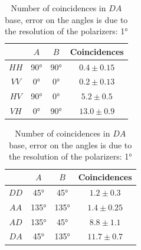 \documentclass[a4paper,10pt]{article}
\begin{document}
\begin{table}[h]
\centering
\begin{minipage}{.48\textwidth}
\centering
\begin{tabular}{c|c|c|c}
  & $A$& $B$& Coincidences \\
\hline
$HH$ & 90° & 90° & $0.4 \pm 0.15$\\
$VV$ & 0° & 0° & $0.2 \pm 0.13$\\
$HV$ & 90° & 0° & $5.2 \pm 0.5$ \\
$VH$ & 0° & 90° & $13.0\pm 0.9$\\
\end{tabular}
\caption{\label{tab:visibilityHV}Number of coincidences in $HV$ base, error on the angles is due to the resolution of the polarizers: 1°}
\end{minipage}\hspace{1.5em}%
\begin{minipage}{.48\textwidth}
\centering
\begin{tabular}{c|c|c|c}
  & $A$& $B$& Coincidences \\
\hline
$DD$ & 45° & 45° & $1.2 \pm 0.3$\\
$AA$ & 135° & 135° & $1.4 \pm 0.25$\\
$AD$ & 135° & 45° & $8.8 \pm 1.1$ \\
$DA$ & 45° & 135° & $11.7 \pm 0.7$\\
\end{tabular}
\caption{\label{tab:visibilityDA}Number of coincidences in $DA$ base, error on the angles is due to the resolution of the polarizers: 1°}
\end{minipage}
\end{table}
\end{document}
